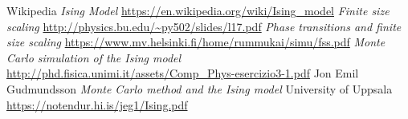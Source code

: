 \documentclass[a4paper, 11pt]{article}
\begin{document}
  \begin{thebibliography}{100}
     Wikipedia \emph{Ising Model} \url{https://en.wikipedia.org/wiki/Ising_model}
     \emph{Finite size scaling} \url{http://physics.bu.edu/~py502/slides/l17.pdf}
     \emph{Phase transitions and finite size scaling} \url{https://www.mv.helsinki.fi/home/rummukai/simu/fss.pdf}
     \emph{Monte Carlo simulation of the Ising model} \url{http://phd.fisica.unimi.it/assets/Comp_Phys-esercizio3-1.pdf}
     Jon Emil Gudmundsson \emph{Monte Carlo method and the Ising model} University of Uppsala \url{https://notendur.hi.is/jeg1/Ising.pdf}

  \end{thebibliography}
\end{document}
